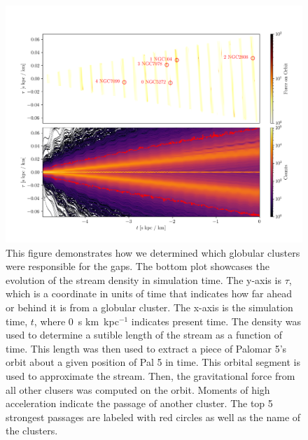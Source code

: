 \documentclass[draft]{aa}
\begin{document}
  


  \begin{figure}
    \centering
    \includegraphics[width=\linewidth]{force_on_orbit-monte-carlo-009.png}
    \caption[]{This figure demonstrates how we determined which globular clusters were responsible for the gaps. The bottom plot showcases the evolution of the stream density in simulation time. The y-axis is $\tau$, which is a coordinate in units of time that indicates how far ahead or behind it is from a globular cluster. The x-axis is the simulation time, $t$, where 0~s km~kpc$^{-1}$ indicates present time. The density was used to determine a sutible length of the stream as a function of time. This length was then used to extract a piece of Palomar 5's orbit about a given position of Pal 5 in time. This orbital segment is used to approximate the stream. Then, the gravitational force from all other clusers was computed on the orbit. Moments of high acceleration indicate the passage of another cluster. The top 5 strongest passages are labeled with red circles as well as the name of the clusters. }
    \label{fig:force-on-orbit}
    \end{figure}  
\end{document}
